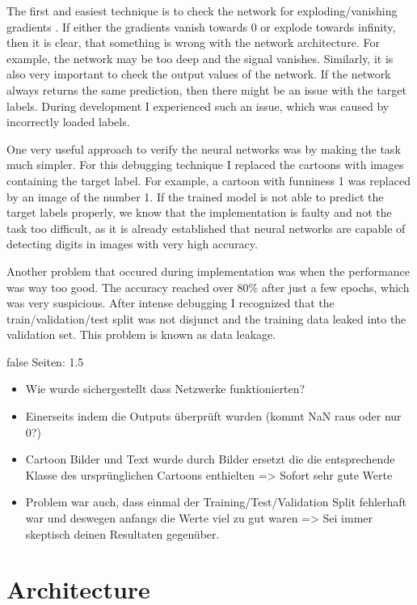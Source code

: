 \documentclass[draft,final,oneside]{vutinfth} %
\begin{document}
The first and easiest technique is to check the network for exploding/vanishing gradients \cite{vanishinggradient}. If either the gradients vanish towards 0 or explode towards infinity, then it is clear, that something is wrong with the network architecture. For example, the network may be too deep and the signal vanishes. Similarly, it is also very important to check the output values of the network. If the network always returns the same prediction, then there might be an issue with the target labels. During development I experienced such an issue, which was caused by incorrectly loaded labels.

One very useful approach to verify the neural networks was by making the task much simpler. For this debugging technique I replaced the cartoons with images containing the target label. For example, a cartoon with funniness 1 was replaced by an image of the number 1. If the trained model is not able to  predict the target labels properly, we know that the implementation is faulty and not the task too difficult, as it is already established that neural networks are capable of detecting digits in images with very high accuracy.

Another problem that occured during implementation was when the performance was way too good. The accuracy reached over 80\% after just a few epochs, which was very suspicious. After intense debugging I recognized that the train/validation/test split was not disjunct and the training data leaked into the validation set. This problem is known as data leakage.

\if false
Seiten: 1.5

\begin{itemize}
\item Wie wurde sichergestellt dass Netzwerke funktionierten? 
\item Einerseits indem die Outputs überprüft wurden (kommt NaN raus oder nur 0?)
\item Cartoon Bilder und Text wurde durch Bilder ersetzt die die entsprechende Klasse des ursprünglichen Cartoons enthielten => Sofort sehr gute Werte
\item Problem war auch, dass einmal der Training/Test/Validation Split fehlerhaft war und deswegen anfangs die Werte viel zu gut waren => Sei immer skeptisch deinen Resultaten gegenüber.
\end{itemize}
\fi


\section{Architecture}
\end{document}
